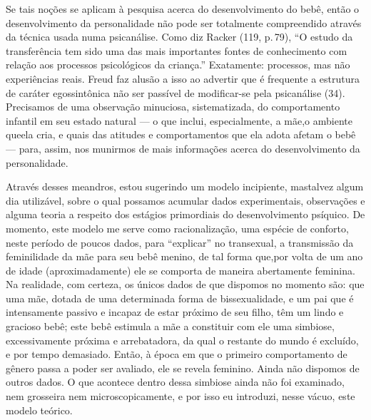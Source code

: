 Se tais noções se aplicam à pesquisa acerca do desenvolvimento do
bebê, então o desenvolvimento da personalidade não pode ser totalmente
compreendido através da técnica usada numa psicanálise. Como diz Racker\idxracker{}
(119, p.\,79), ``O estudo da transferência\idxtransf{} tem sido uma
das mais importantes fontes de conhecimento com relação aos processos
psicológicos da criança.'' Exatamente: processos, mas não
experiências reais. Freud\idxfreudestru{} faz alusão a isso ao advertir que é frequente
 a estrutura de caráter egossintônica\idxinfanego{} não ser passível de modificar-se
pela psicanálise (34). Precisamos de uma observação minuciosa,
sistematizada, do comportamento infantil em seu estado natural --- o
que inclui, especialmente, a mãe,\idxmaestran[|(] o ambiente que\idxtransesimb[|(] ela cria, e quais das
atitudes e comportamentos que ela adota afetam o bebê --- para,
assim, nos munirmos de mais informações acerca do desenvolvimento da
personalidade.

Através desses meandros, estou sugerindo um modelo incipiente, mas\idxtranseetio[|(]
talvez algum dia utilizável, sobre o qual possamos acumular dados
experimentais, observações e alguma teoria a respeito dos estágios
primordiais do desenvolvimento psíquico. De momento, este modelo me
serve como racionalização, uma espécie de conforto, neste período de
poucos dados, para ``explicar'' no
transexual, a transmissão da feminilidade da mãe\idxpaisfilh{} para seu bebê menino,
de tal forma que,\idxmaesfilh[|(] por volta de um ano de idade (aproximadamente) ele se
comporta de maneira abertamente feminina. Na realidade, com certeza,
os únicos dados de que dispomos no momento são: que uma mãe, dotada de
uma determinada forma de bissexualidade,\idxmaesbiss{} e um pai que é intensamente
passivo e incapaz de estar próximo de seu filho, têm um lindo e
gracioso bebê; este bebê estimula a mãe a constituir com ele uma
simbiose, excessivamente próxima e arrebatadora, da qual o restante do
mundo é excluído, e por tempo demasiado. Então, à época em que o
primeiro comportamento de gênero passa a poder ser avaliado, ele se
revela feminino. Ainda não dispomos de outros dados. O que acontece
dentro dessa simbiose ainda não foi examinado, nem grosseira nem
microscopicamente, e por isso eu introduzi, nesse vácuo, este modelo
teórico.

